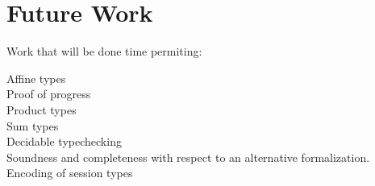 \documentclass[a4paper,UKenglish,cleveref, autoref, thm-restate,authorcolumns]{lipics-v2019}
\theoremstyle{definition}
\begin{document}
\section{Future Work}

Work that will be done time permiting:

\begin{description}

\item [Affine types]
  
\item [Proof of progress]

\item [Product types]

\item [Sum types]

\item [Decidable typechecking]

\item [Soundness and completeness with respect to an alternative formalization.]

\item [Encoding of session types]

\end{description}



\end{document}
